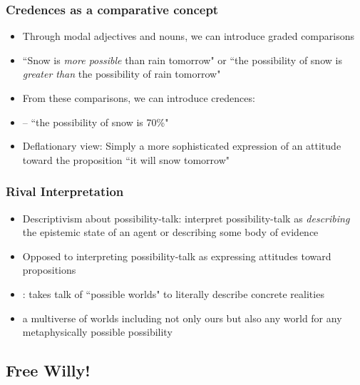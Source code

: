\begin{frame}
\frametitle{Credences as a comparative concept}

\begin{itemize}[<+->]

\item Through modal adjectives and nouns, we can introduce graded comparisons

\item ``Snow is \textit{more possible} than rain tomorrow" or ``the possibility of snow is \textit{greater than} the possibility of rain tomorrow"

\item From these comparisons, we can introduce credences:

\item[] -- ``the possibility of snow is 70\%" 

\item Deflationary view: Simply a more sophisticated expression of an attitude toward the proposition ``it will snow tomorrow"



\end{itemize}
\end{frame}

\begin{frame}
\frametitle{Rival Interpretation}

\begin{itemize}[<+->]

\item Descriptivism about possibility-talk: interpret possibility-talk as \textit{describing} the epistemic state of an agent or describing some body of evidence

\item Opposed to interpreting possibility-talk as expressing attitudes toward propositions 

\item {}: takes talk of ``possible worlds" to literally describe concrete realities 
\item[] a multiverse of worlds including not only ours but also any world for any metaphysically possible possibility 

\end{itemize}
\end{frame}

\subsection{Free Willy!}

